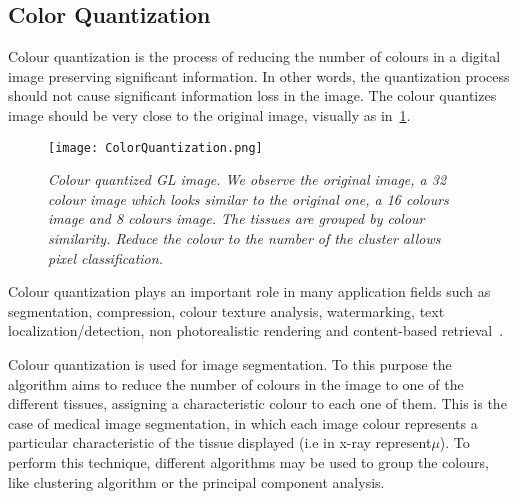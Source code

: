 \documentclass{standalone}
\begin{document}
\subsection{Color Quantization}
	
	Colour quantization is the process of reducing the number of colours in a digital image preserving significant information. In other words, the quantization process should not cause significant information loss in the image.  The colour quantizes image should be very close to the original image, visually as in \figurename\,\ref{fig:ColorQuantization}. 


	\begin{figure}[h!]	
		\centering
			\texttt{[image: ColorQuantization.png]}
		\caption{\textit{Colour quantized GL image. We observe the original image, a 32 colour image which looks similar to the original one, a 16 colours image and 8 colours image. The tissues are grouped by colour similarity. Reduce the colour to the number of the cluster allows pixel classification. }}\label{fig:ColorQuantization}
	\end{figure}

	Colour quantization plays an important role in many application fields such as segmentation, compression, colour texture analysis, watermarking, 
	text localization/detection, non photorealistic rendering and content-based retrieval~\cite{ART:Ozturk}.
		
	Colour quantization is used for image segmentation. To this purpose the algorithm aims to reduce the number of colours in the image to one of the different tissues, assigning a characteristic colour to each one of them. This is the case of medical image segmentation, in which each image colour represents a particular characteristic of the tissue displayed (i.e in x-ray represent$\mu$). 
	To perform this technique, different algorithms may be used to group the colours, like clustering algorithm or the principal component analysis.


	
	
	
	

	
	
\end{document}
